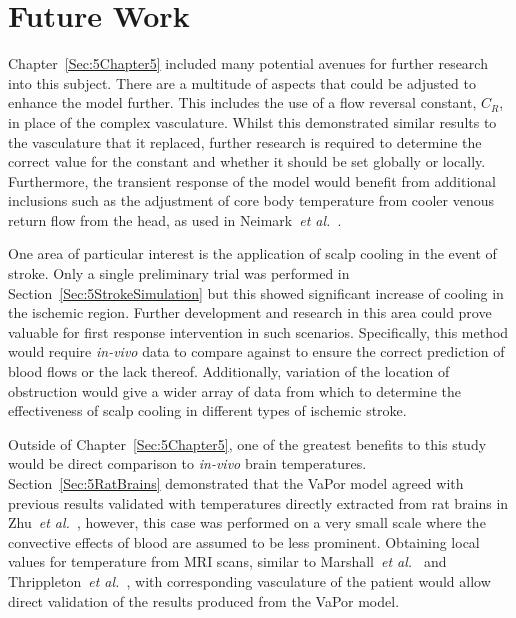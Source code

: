 \documentclass[11pt,english,a4paper,twoside,openright]{report}
\begin{document}
{{{{{{{\section[Future Work]{{\Large F}uture {\Large W}ork}

Chapter~\ref{Sec:5Chapter5} included many potential avenues for further research into this subject. There are a multitude of aspects that could be adjusted to enhance the model further. This includes the use of a flow reversal constant, $C_{R}$, in place of the complex vasculature. Whilst this demonstrated similar results to the vasculature that it replaced, further research is required to determine the correct value for the constant and whether it should be set globally or locally. Furthermore, the transient response of the model would benefit from additional inclusions such as the adjustment of core body temperature from cooler venous return flow from the head, as used in Neimark~\textit{et al.\ }\cite{neimark2008brain}. 

One area of particular interest is the application of scalp cooling in the event of stroke. Only a single preliminary trial was performed in Section~\ref{Sec:5StrokeSimulation} but this showed significant increase of cooling in the ischemic region. Further development and research in this area could prove valuable for first response intervention in such scenarios. Specifically, this method would require \textit{in-vivo} data to compare against to ensure the correct prediction of blood flows or the lack thereof. Additionally, variation of the location of obstruction would give a wider array of data from which to determine the effectiveness of scalp cooling in different types of ischemic stroke.

Outside of Chapter~\ref{Sec:5Chapter5}, one of the greatest benefits to this study would be direct comparison to \textit{in-vivo} brain temperatures. Section~\ref{Sec:5RatBrains} demonstrated that the VaPor model agreed with previous results validated with temperatures directly extracted from rat brains in Zhu~\textit{et al.\ }\cite{zhu2006body}, however, this case was performed on a very small scale where the convective effects of blood are assumed to be less prominent. Obtaining local values for temperature from MRI scans, similar to Marshall~\textit{et al.\ }\cite{marshall2006measurement} and Thrippleton~\textit{et al.\ }\cite{thrippleton2014reliability}, with corresponding vasculature of the patient would allow direct validation of the results produced from the VaPor model.

}}}}}}}
\end{document}
